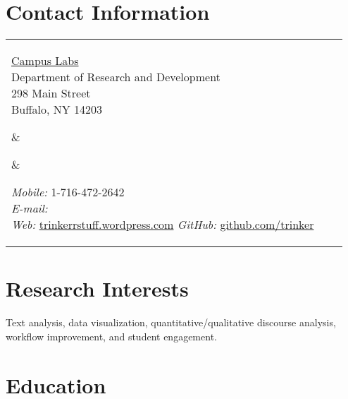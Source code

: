 


\section{Contact Information}


\newlength{\rcollength}\setlength{\rcollength}{2.1in}%
\newlength{\spacewidth}\setlength{\spacewidth}{20pt}
\begin{tabular}[t]{@{}p{\textwidth-\rcollength-\spacewidth}@{}p{\spacewidth}@{}p{\rcollength}}%

\parbox{\textwidth-\rcollength-\spacewidth}{%
\href{http://www.campuslabs.com}{Campus Labs}\\
Department of Research and Development\\	
298 Main Street\\
Buffalo, NY 14203\\}

&
\parbox[m][5\baselineskip]{\spacewidth}{} &

\parbox{\rcollength}{%
\textit{Mobile:} 1-716-472-2642 \\
\textit{E-mail:} \\
\textit{Web:} \href{http://trinkerrstuff.wordpress.com}{trinkerrstuff.wordpress.com}
\textit{GitHub:} \href{https://github.com/trinker}{github.com/trinker}
}

\end{tabular}

\section{Research Interests}

Text analysis, data visualization, quantitative/qualitative discourse analysis, workflow improvement, and student engagement.

\section{Education}

